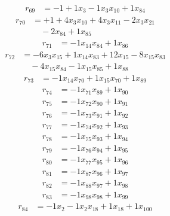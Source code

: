 \[\begin{aligned}
r_{69} &= - 1 + 1 x_{3} - 1 x_{3} x_{10} + 1 x_{84}
\end{aligned}\]
\[\begin{aligned}
r_{70} &= + 1 + 4 x_{3} x_{10} + 4 x_{3} x_{11} - 2 x_{3} x_{21} \\
 &\quad - 2 x_{84} + 1 x_{85}
\end{aligned}\]
\[\begin{aligned}
r_{71} &= - 1 x_{14} x_{84} + 1 x_{86}
\end{aligned}\]
\[\begin{aligned}
r_{72} &= - 6 x_{3} x_{15} + 1 x_{14} x_{83} + 12 x_{15} - 8 x_{15} x_{83} \\
 &\quad - 4 x_{15} x_{84} - 1 x_{15} x_{85} + 1 x_{88}
\end{aligned}\]
\[\begin{aligned}
r_{73} &= - 1 x_{14} x_{70} + 1 x_{15} x_{70} + 1 x_{89}
\end{aligned}\]
\[\begin{aligned}
r_{74} &= - 1 x_{71} x_{89} + 1 x_{90}
\end{aligned}\]
\[\begin{aligned}
r_{75} &= - 1 x_{72} x_{90} + 1 x_{91}
\end{aligned}\]
\[\begin{aligned}
r_{76} &= - 1 x_{73} x_{91} + 1 x_{92}
\end{aligned}\]
\[\begin{aligned}
r_{77} &= - 1 x_{74} x_{92} + 1 x_{93}
\end{aligned}\]
\[\begin{aligned}
r_{78} &= - 1 x_{75} x_{93} + 1 x_{94}
\end{aligned}\]
\[\begin{aligned}
r_{79} &= - 1 x_{76} x_{94} + 1 x_{95}
\end{aligned}\]
\[\begin{aligned}
r_{80} &= - 1 x_{77} x_{95} + 1 x_{96}
\end{aligned}\]
\[\begin{aligned}
r_{81} &= - 1 x_{87} x_{96} + 1 x_{97}
\end{aligned}\]
\[\begin{aligned}
r_{82} &= - 1 x_{88} x_{97} + 1 x_{98}
\end{aligned}\]
\[\begin{aligned}
r_{83} &= - 1 x_{98} x_{98} + 1 x_{99}
\end{aligned}\]
\[\begin{aligned}
r_{84} &= - 1 x_{2} - 1 x_{2} x_{18} + 1 x_{18} + 1 x_{100}
\end{aligned}\]
